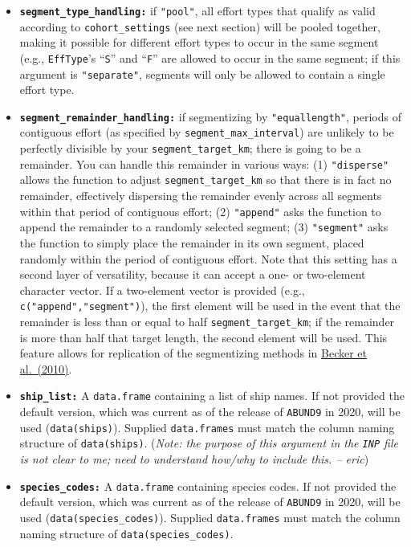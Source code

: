\documentclass[
]{book}
\begin{document}
\begin{itemize}
\item
  \textbf{\texttt{segment\_type\_handling:}} if \texttt{"pool"}, all effort types that qualify as valid according to \texttt{cohort\_settings} (see next section) will be pooled together, making it possible for different effort types to occur in the same segment (e.g., \texttt{EffType}'s ``\texttt{S}'' and ``\texttt{F}'' are allowed to occur in the same segment; if this argument is \texttt{"separate"}, segments will only be allowed to contain a single effort type.
\item
  \textbf{\texttt{segment\_remainder\_handling:}} if segmentizing by \texttt{"equallength"}, periods of contiguous effort (as specified by \texttt{segment\_max\_interval}) are unlikely to be perfectly divisible by your \texttt{segment\_target\_km}; there is going to be a remainder. You can handle this remainder in various ways: (1) \texttt{"disperse"} allows the function to adjust \texttt{segment\_target\_km} so that there is in fact no remainder, effectively dispersing the remainder evenly across all segments within that period of contiguous effort; (2) \texttt{"append"} asks the function to append the remainder to a randomly selected segment; (3) \texttt{"segment"} asks the function to simply place the remainder in its own segment, placed randomly within the period of contiguous effort. Note that this setting has a second layer of versatility, because it can accept a one- or two-element character vector. If a two-element vector is provided (e.g., \texttt{c("append","segment")}), the first element will be used in the event that the remainder is less than or equal to half \texttt{segment\_target\_km}; if the remainder is more than half that target length, the second element will be used. This feature allows for replication of the segmentizing methods in \href{https://www.int-res.com/abstracts/meps/v413/p163-183/}{Becker et al.~(2010)}.
\item
  \textbf{\texttt{ship\_list:}} A \texttt{data.frame} containing a list of ship names. If not provided the default version, which was current as of the release of \texttt{ABUND9} in 2020, will be used (\texttt{data(ships)}). Supplied \texttt{data.frames} must match the column naming structure of \texttt{data(ships)}. (\emph{Note: the purpose of this argument in the \texttt{INP} file is not clear to me; need to understand how/why to include this. -- eric})
\item
  \textbf{\texttt{species\_codes:}} A \texttt{data.frame} containing species codes. If not provided the default version, which was current as of the release of \texttt{ABUND9} in 2020, will be used (\texttt{data(species\_codes)}). Supplied \texttt{data.frames} must match the column naming structure of \texttt{data(species\_codes)}.

\end{itemize}
\end{document}
